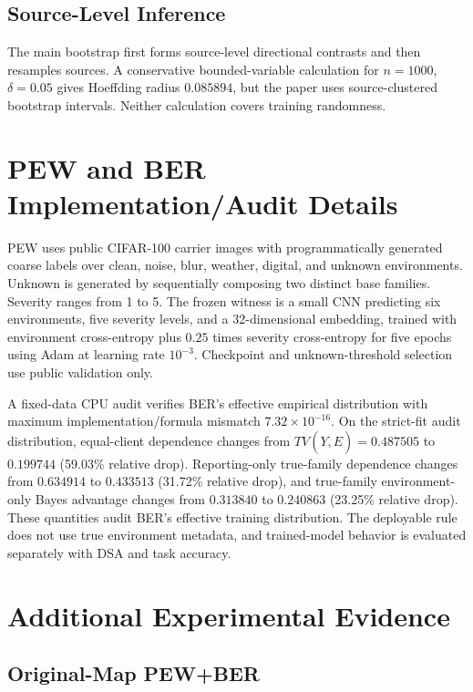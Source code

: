 \subsection{Source-Level Inference}

The main bootstrap first forms source-level directional contrasts and then resamples sources. A conservative bounded-variable calculation for \(n=1000\), \(\delta=0.05\) gives Hoeffding radius \(0.085894\), but the paper uses source-clustered bootstrap intervals. Neither calculation covers training randomness.

\section{PEW and BER Implementation/Audit Details}

PEW uses public CIFAR-100 carrier images with programmatically generated coarse labels over clean, noise, blur, weather, digital, and unknown environments. Unknown is generated by sequentially composing two distinct base families. Severity ranges from 1 to 5. The frozen witness is a small CNN predicting six environments, five severity levels, and a 32-dimensional embedding, trained with environment cross-entropy plus \(0.25\) times severity cross-entropy for five epochs using Adam at learning rate \(10^{-3}\). Checkpoint and unknown-threshold selection use public validation only.

A fixed-data CPU audit verifies BER's effective empirical distribution with maximum implementation/formula mismatch \(7.32\times10^{-16}\). On the strict-fit audit distribution, equal-client dependence changes from \(TV(Y,\hat E)=0.487505\) to \(0.199744\) (59.03\% relative drop). Reporting-only true-family dependence changes from \(0.634914\) to \(0.433513\) (31.72\% relative drop), and true-family environment-only Bayes advantage changes from \(0.313840\) to \(0.240863\) (23.25\% relative drop). These quantities audit BER's effective training distribution. The deployable rule does not use true environment metadata, and trained-model behavior is evaluated separately with DSA and task accuracy.

\section{Additional Experimental Evidence}

\subsection{Original-Map PEW+BER}

